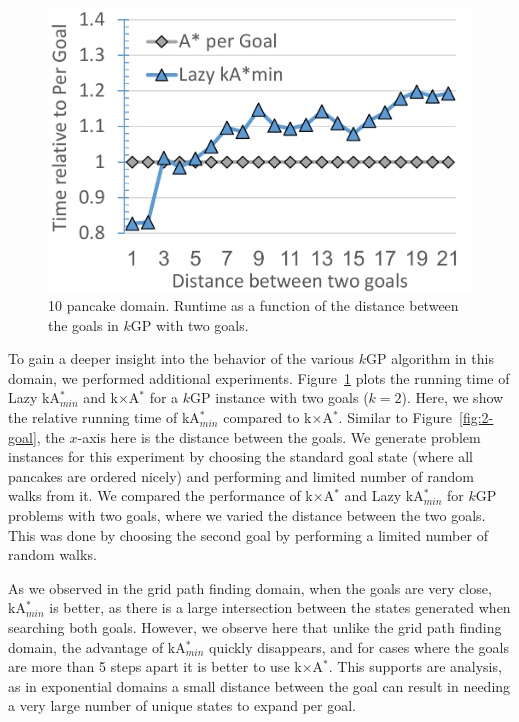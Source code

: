 \documentclass{aicom2e}
\newcommand{\kgs}{$k$GP}
\newcommand{\kastarmin}{kA$^*_{min}$}
\newcommand{\kxastar}{k$\times$A$^*$}
\begin{document}
\begin{figure}
    \includegraphics[width=\columnwidth]{pancake-goal-distance_cropped.pdf}
    \caption{10 pancake domain. Runtime as a function of the distance between the goals in \kgs{} with two goals.}
    \label{fig:2-goal-pancake}
\end{figure}


To gain a deeper insight into the behavior of the various \kgs{} algorithm in this domain, we performed additional experiments.  Figure~\ref{fig:2-goal-pancake} plots the running time of Lazy \kastarmin{} and \kxastar{} for a \kgs{} instance with two goals ($k=2$). Here, we show the relative running time of \kastarmin{} compared to \kxastar{}. Similar to Figure~\ref{fig:2-goal}, the $x$-axis here is the distance between the goals. We generate problem instances for this experiment by choosing the standard goal state (where all pancakes are ordered nicely) and performing and limited number of random walks from it. We compared the performance of \kxastar{} and Lazy \kastarmin{} for \kgs{} problems with two goals, where we varied the distance between the two goals. This was done by choosing the second goal by performing a limited number of random walks.


As we observed in the grid path finding domain, when the goals are very close, \kastarmin{} is better, as there is a large intersection between the states generated when searching both goals. However, we observe here that unlike the grid path finding domain, the advantage of \kastarmin{} quickly disappears, and for cases where the goals are more than 5 steps apart it is better to use \kxastar{}. This supports are analysis, as in exponential domains a small distance between the goal can result in needing a very large number of unique states to expand per goal.
\end{document}
